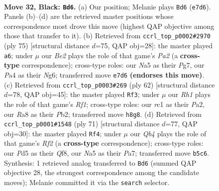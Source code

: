\documentclass[11pt]{article}
\begin{document}
\clearpage

\begin{figure}[p]\centering
\begin{subfigure}{0.46\textwidth}\centering
\resizebox{\linewidth}{!}{%
\newchessgame
\chessboard[
  setfen={r3k2r/p3b1pp/8/nq1p4/p2P2PP/4P2K/1BQN4/2R5 b - - 0 32},
  showmover=false,
  pgfstyle=straightmove, color=movearrow, markmove={e7-d6}
]}
\caption{}
\end{subfigure}\hfill
\begin{subfigure}{0.46\textwidth}\centering
\resizebox{\linewidth}{!}{%
\newchessgame
\chessboard[
  setfen={3r3k/pp1q2pp/5pn1/8/1P1NQ1P1/2P4P/4RP2/6K1 b - - 0 38},
  showmover=false,
  pgfstyle=straightmove, color=movearrow, markmove={a7-a6}
]}
\caption{}
\end{subfigure}
\\[4pt]
\begin{subfigure}{0.46\textwidth}\centering
\resizebox{\linewidth}{!}{%
\newchessgame
\chessboard[
  setfen={7r/ppk1np2/2pb3q/8/3PQN2/6PB/PP4P1/3K1R2 w - - 9 32},
  showmover=false,
  pgfstyle=straightmove, color=movearrow, markmove={f1-f3}
]}
\caption{}
\end{subfigure}\hfill
\begin{subfigure}{0.46\textwidth}\centering
\resizebox{\linewidth}{!}{%
\newchessgame
\chessboard[
  setfen={5q2/pb3r1k/1p1p2p1/7p/1PPQ4/7P/P5P1/3R1BK1 b - - 0 36},
  showmover=false,
  pgfstyle=straightmove, color=movearrow, markmove={f7-f4}
]}
\caption{}
\end{subfigure}
\caption{\textbf{Move 32, Black: \texttt{Bd6}.} (a) Our position; Melanie plays \texttt{Bd6} (\texttt{e7d6}). Panels (b)--(d) are the retrieved master positions whose correspondence most drove this move (highest QAP objective among those that transfer to it). (b) Retrieved from \texttt{ccrl\_top\_p0002\#2970} (ply 75) [structural distance $d$=75, QAP obj=28]: the master played \texttt{a6}; under $\mu$ our \emph{Be2} plays the role of that game's \emph{Pa2} (a \textbf{cross-type} correspondence); cross-type roles: our \emph{N}a5 as their \emph{P}g7, our \emph{P}a4 as their \emph{N}g6; transferred move \texttt{e7d6} \textbf{(endorses this move)}. (c) Retrieved from \texttt{ccrl\_top\_p0003\#269} (ply 62) [structural distance $d$=78, QAP obj=45]: the master played \texttt{Rf3}; under $\mu$ our \emph{Rh1} plays the role of that game's \emph{Rf1}; cross-type roles: our \emph{r}c1 as their \emph{P}a2, our \emph{R}a8 as their \emph{P}b2; transferred move \texttt{h8g8}. (d) Retrieved from \texttt{ccrl\_top\_p0001\#1548} (ply 71) [structural distance $d$=77, QAP obj=30]: the master played \texttt{Rf4}; under $\mu$ our \emph{Qb4} plays the role of that game's \emph{Rf2} (a \textbf{cross-type} correspondence); cross-type roles: our \emph{P}d5 as their \emph{Q}f8, our \emph{N}a5 as their \emph{P}a7; transferred move \texttt{b5c6}. Synthesis: 1 retrieved analog transferred to \texttt{Bd6} (summed QAP objective 28, the strongest correspondence among the candidate moves); Melanie committed it via the \texttt{search} selector.}
\label{fig:thought-m63}
\end{figure}
\end{document}
